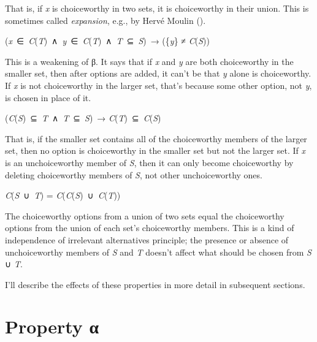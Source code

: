 \documentclass[
  11pt,
  letterpaper,
  DIV=11,
  numbers=noendperiod,
  twoside]{scrartcl}
\providecommand{\tightlist}{%
  \setlength{\itemsep}{0pt}\setlength{\parskip}{0pt}}
\begin{document}
That is, if \emph{x} is choiceworthy in two sets, it is choiceworthy in
their union. This is sometimes called \emph{expansion}, e.g., by Hervé
Moulin ().

\begin{description}
\tightlist
\item[Property δ]
(\emph{x}~∈~\emph{C}(\emph{T})~∧~\emph{y}~∈~\emph{C}(\emph{T})~∧~\emph{T}~⊆~\emph{S})~→
(\{\emph{y}\} ≠ \emph{C}(\emph{S}))
\end{description}

This is a weakening of β. It says that if \emph{x} and \emph{y} are both
choiceworthy in the smaller set, then after options are added, it can't
be that \emph{y} alone is choiceworthy. If \emph{x} is not choiceworthy
in the larger set, that's because some other option, not \emph{y}, is
chosen in place of it.

\begin{description}
\tightlist
\item[Property Aiz]
(\emph{C}(\emph{S})~⊆~\emph{T}~∧~\emph{T}~⊆~\emph{S})~→
\emph{C}(\emph{T})~⊆~\emph{C}(\emph{S})
\end{description}

That is, if the smaller set contains all of the choiceworthy members of
the larger set, then no option is choiceworthy in the smaller set but
not the larger set. If \emph{x} is an unchoiceworthy member of \emph{S},
then it can only become choiceworthy by deleting choiceworthy members of
\emph{S}, not other unchoiceworthy ones.

\begin{description}
\tightlist
\item[Path Independence]
\emph{C}(\emph{S}~∪~\emph{T}) =
\emph{C}(\emph{C}(\emph{S})~∪~\emph{C}(\emph{T}))
\end{description}

The choiceworthy options from a union of two sets equal the choiceworthy
options from the union of each set's choiceworthy members. This is a
kind of independence of irrelevant alternatives principle; the presence
or absence of unchoiceworthy members of \emph{S} and \emph{T} doesn't
affect what should be chosen from \emph{S} ∪ \emph{T}.

I'll describe the effects of these properties in more detail in
subsequent sections.

\section{Property α}\label{sec-alpha}
\end{document}

